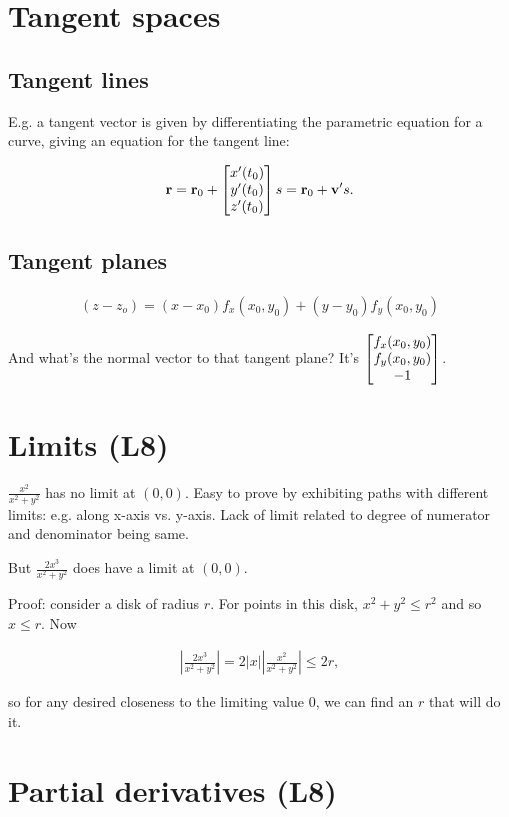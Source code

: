 \documentclass[12pt]{article}
\begin{document}
\section*{Tangent spaces}

\subsection*{Tangent lines}
E.g. a tangent vector is given by differentiating the parametric equation for a
curve, giving an equation for the tangent line:

\begin{align*}
  \mathbf{r} = \mathbf{r}_0 + \begin{bmatrix}x'(t_0)\\y'(t_0)\\z'(t_0)\end{bmatrix}s = \mathbf{r}_0 + \mathbf{v}' s.
\end{align*}

\subsection*{Tangent planes}

\begin{align*}
  (z - z_o) = (x - x_0)f_x(x_0, y_0) + (y - y_0)f_y(x_0, y_0)
\end{align*}

And what's the normal vector to that tangent plane? It's
$\begin{bmatrix}f_x(x_0, y_0)\\f_y(x_0, y_0)\\-1\end{bmatrix}$.


\section*{Limits (L8)}

$\frac{x^2}{x^2 + y^2}$ has no limit at $(0, 0)$.
Easy to prove by exhibiting paths with different limits: e.g. along x-axis vs. y-axis.
Lack of limit related to degree of numerator and denominator being same.

But $\frac{2x^3}{x^2 + y^2}$ does have a limit at $(0, 0)$.

Proof: consider a disk of radius $r$. For points in this disk, $x^2 + y^2 \leq r^2$ and so $x \leq r$.
Now

\begin{align*}
  \left|\frac{2x^3}{x^2 + y^2}\right| = 2|x|\left|\frac{x^2}{x^2 + y^2}\right| \leq 2r,
\end{align*}

so for any desired closeness to the limiting value 0, we can find an $r$ that will do it.

\section*{Partial derivatives (L8)}
\end{document}
